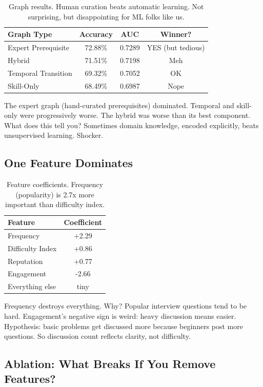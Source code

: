 \documentclass[conference]{IEEEtran}
\begin{document}
\begin{table}[h]
\centering
\small
\begin{tabular}{l|c|c|c}
\toprule
\textbf{Graph Type} & \textbf{Accuracy} & \textbf{AUC} & \textbf{Winner?} \\
\midrule
Expert Prerequisite & 72.88\% & 0.7289 & YES (but tedious) \\
Hybrid & 71.51\% & 0.7198 & Meh \\
Temporal Transition & 69.32\% & 0.7052 & OK \\
Skill-Only & 68.49\% & 0.6987 & Nope \\
\bottomrule
\end{tabular}
\caption{Graph results. Human curation beats automatic learning. Not surprising, but disappointing for ML folks like us.}
\end{table}

The expert graph (hand-curated prerequisites) dominated. Temporal and skill-only were progressively worse. The hybrid was worse than its best component. What does this tell you? Sometimes domain knowledge, encoded explicitly, beats unsupervised learning. Shocker.

\subsection{One Feature Dominates}

\begin{table}[h]
\centering
\small
\begin{tabular}{l|c}
\toprule
\textbf{Feature} & \textbf{Coefficient} \\
\midrule
Frequency & +2.29 \\
Difficulty Index & +0.86 \\
Reputation & +0.77 \\
Engagement & -2.66 \\
Everything else & tiny \\
\bottomrule
\end{tabular}
\caption{Feature coefficients. Frequency (popularity) is 2.7x more important than difficulty index.}
\end{table}

Frequency destroys everything. Why? Popular interview questions tend to be hard. Engagement's negative sign is weird: heavy discussion means easier. Hypothesis: basic problems get discussed more because beginners post more questions. So discussion count reflects clarity, not difficulty.

\subsection{Ablation: What Breaks If You Remove Features?}
\end{document}

